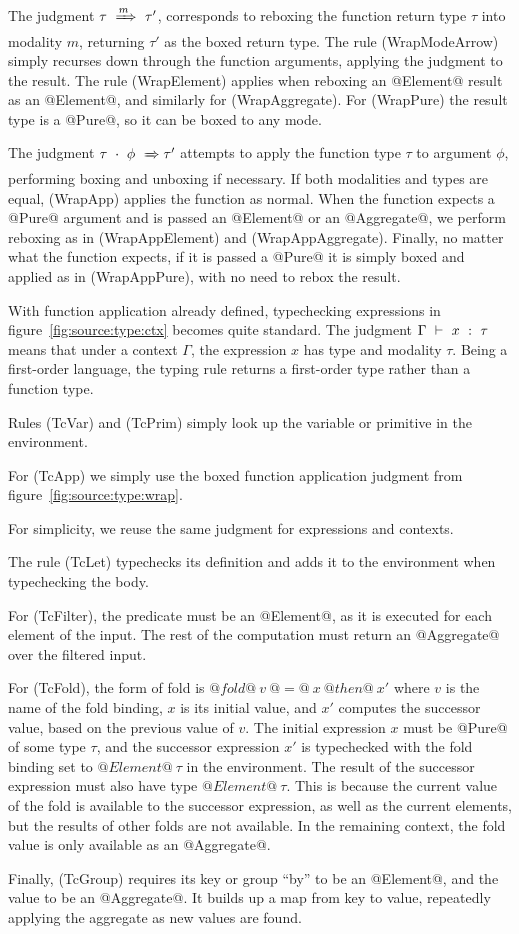 The judgment $\tau ~\xRightarrow{m}~ \tau'$, corresponds to reboxing the function return type $\tau$ into modality $m$, returning $\tau'$ as the boxed return type.
The rule (WrapModeArrow) simply recurses down through the function arguments, applying the judgment to the result.
The rule (WrapElement) applies when reboxing an @Element@ result as an @Element@, and similarly for (WrapAggregate).
For (WrapPure) the result type is a @Pure@, so it can be boxed to any mode.

The judgment $\tau~\cdot~\phi ~\xRightarrow~ \tau'$ attempts to apply the function type $\tau$ to argument $\phi$, performing boxing and unboxing if necessary.
If both modalities and types are equal, (WrapApp) applies the function as normal.
When the function expects a @Pure@ argument and is passed an @Element@ or an @Aggregate@, we perform reboxing as in (WrapAppElement) and (WrapAppAggregate).
Finally, no matter what the function expects, if it is passed a @Pure@ it is simply boxed and applied as in (WrapAppPure), with no need to rebox the result.




With function application already defined, typechecking expressions in figure~\ref{fig:source:type:ctx} becomes quite standard.
The judgment $\Gamma ~\vdash~ x ~:~ \tau$ means that under a context $\Gamma$, the expression $x$ has type and modality $\tau$.
Being a first-order language, the typing rule returns a first-order type rather than a function type.

Rules (TcVar) and (TcPrim) simply look up the variable or primitive in the environment.


For (TcApp) we simply use the boxed function application judgment from figure~\ref{fig:source:type:wrap}.

For simplicity, we reuse the same judgment for expressions and contexts.

The rule (TcLet) typechecks its definition and adds it to the environment when typechecking the body.

For (TcFilter), the predicate must be an @Element@, as it is executed for each element of the input.
The rest of the computation must return an @Aggregate@ over the filtered input.

For (TcFold), the form of fold is $@fold@~v~@=@~x~@then@~x'$ where $v$ is the name of the fold binding, $x$ is its initial value, and $x'$ computes the successor value, based on the previous value of $v$.
The initial expression $x$ must be @Pure@ of some type $\tau$, and the successor expression $x'$ is typechecked with the fold binding set to $@Element@~\tau$ in the environment.
The result of the successor expression must also have type $@Element@~\tau$.
This is because the current value of the fold is available to the successor expression, as well as the current elements, but the results of other folds are not available.
In the remaining context, the fold value is only available as an @Aggregate@.

Finally, (TcGroup) requires its key or group ``by'' to be an @Element@, and the value to be an @Aggregate@.
It builds up a map from key to value, repeatedly applying the aggregate as new values are found.





